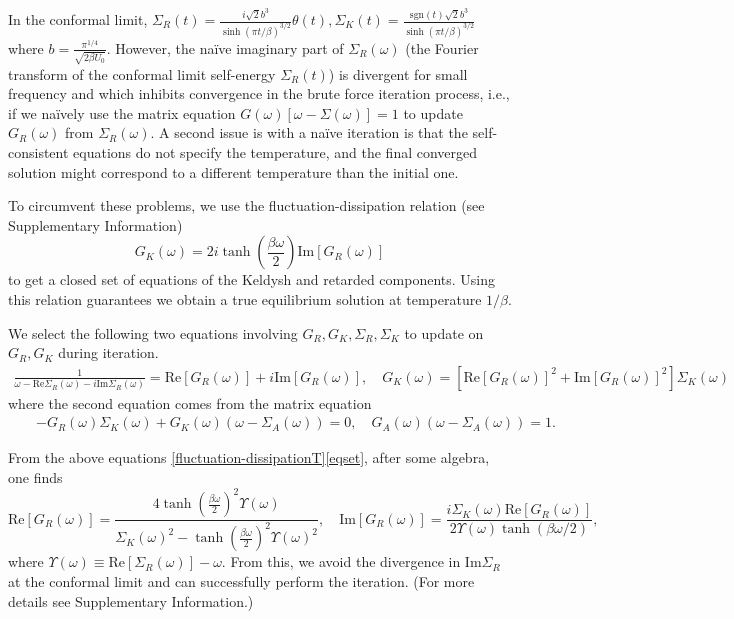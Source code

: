 \documentclass[twocolumn,floatfix,superscriptaddress]{revtex4-1}
\begin{document}
\begin{widetext}
In the conformal limit, $\Sigma_R(t)=\frac{i\sqrt 2 b^3}{\sinh(\pi t/\beta)^{3/2}}\theta(t),
\Sigma_K(t)=\frac{\text{sgn}(t)\sqrt 2 b^3}{\sinh(\pi t/\beta)^{3/2}}$ 
where $b=\frac{\pi^{1/4}}{\sqrt {2\beta U_0}}$.  However, the na\"ive imaginary part of $\Sigma_R(\omega)$ (the Fourier transform of the conformal limit self-energy $\Sigma_R(t)$) is divergent for small frequency and which inhibits convergence in the brute force iteration process, i.e., if we na\"ively use the matrix equation $G(\omega)[\omega-\Sigma(\omega)]=1$ to update $G_R(\omega)$ from $\Sigma_R(\omega)$.  A second issue is with a na\"ive iteration is that the self-consistent equations do not specify the temperature, and the final converged solution might correspond to a different temperature than the initial one.

To circumvent these problems, we use the fluctuation-dissipation relation (see Supplementary Information) 
\begin{equation}
\label{fluctuation-dissipationT}
G_K(\omega)=2i\tanh(\frac{\beta\omega}{2})\text{Im}[G_R(\omega)]
\end{equation}
to get a closed set of equations of the Keldysh and retarded components.  Using this relation guarantees we obtain a true equilibrium solution at temperature $1/\beta$.
 
We select the following two equations involving $G_R,G_K,\Sigma_R,\Sigma_K$ to update on $G_R,G_K$ during iteration.
\begin{eqnarray}
\label{eqset}
\frac{1}{\omega-\text{Re}\Sigma_R(\omega)-i\text{Im}\Sigma_R(\omega)}=\text{Re}[G_R(\omega)]+i \text{Im}[G_R(\omega)],\quad G_K(\omega)=[\text{Re}[G_R(\omega)]^2+\text{Im}[G_R(\omega)]^2]\Sigma_K(\omega)
\end{eqnarray}
where the second equation comes from the matrix equation 
\begin{eqnarray}
&&-G_R(\omega)\Sigma_K(\omega)+G_K(\omega)(\omega-\Sigma_A(\omega))=0,\quad G_A(\omega)(\omega-\Sigma_A(\omega))=1.\nonumber
\end{eqnarray} 

From the above equations \eqref{fluctuation-dissipationT}\eqref{eqset}, after some algebra, one finds 
\[ \text{Re}[G_R(\omega)]=\frac{4\tanh(\frac{\beta\omega}{2})^2 \Upsilon(\omega)}{\Sigma_K(\omega)^2-\tanh(\frac{\beta\omega}{2})^2\Upsilon(\omega)^2},\quad \text{Im}[G_R(\omega)]=\frac{i\Sigma_K(\omega) \text{Re}[G_R(\omega)]}{2\Upsilon(\omega)\tanh(\beta\omega/2)},
\]
where $\Upsilon(\omega)\equiv \text{Re}[\Sigma_R(\omega)]-\omega$. From this, we  avoid the divergence in $\text{Im}\Sigma_R$ at the conformal limit and can successfully perform the iteration. (For more details see Supplementary Information.)


\end{widetext}
\end{document}
